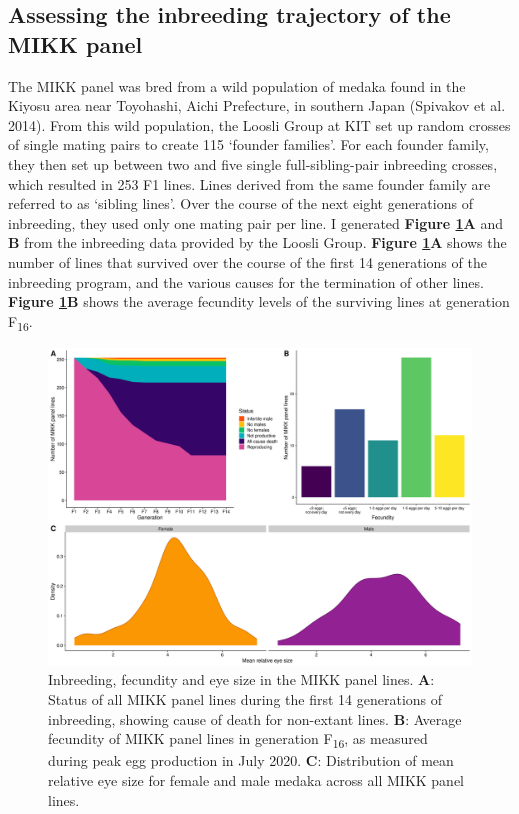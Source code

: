 \documentclass[
]{book}
\begin{document}
\hypertarget{inbreeding-sec}{%
\subsection{Assessing the inbreeding trajectory of the MIKK panel}\label{inbreeding-sec}}

The MIKK panel was bred from a wild population of medaka found in the Kiyosu area near Toyohashi, Aichi Prefecture, in southern Japan (Spivakov et al. 2014). From this wild population, the Loosli Group at KIT set up random crosses of single mating pairs to create 115 `founder families'. For each founder family, they then set up between two and five single full-sibling-pair inbreeding crosses, which resulted in 253 F1 lines. Lines derived from the same founder family are referred to as `sibling lines'. Over the course of the next eight generations of inbreeding, they used only one mating pair per line. I generated \textbf{Figure \ref{fig:InbreedingFigure}A} and \textbf{B} from the inbreeding data provided by the Loosli Group. \textbf{Figure \ref{fig:InbreedingFigure}A} shows the number of lines that survived over the course of the first 14 generations of the inbreeding program, and the various causes for the termination of other lines. \textbf{Figure \ref{fig:InbreedingFigure}B} shows the average fecundity levels of the surviving lines at generation F\textsubscript{16}.



\begin{figure}
\includegraphics[width=1\linewidth]{figs/mikk_genome/20211213_final_figure} \caption{Inbreeding, fecundity and eye size in the MIKK panel lines. \textbf{A}: Status of all MIKK panel lines during the first 14 generations of inbreeding, showing cause of death for non-extant lines. \textbf{B}: Average fecundity of MIKK panel lines in generation F\textsubscript{16}, as measured during peak egg production in July 2020. \textbf{C}: Distribution of mean relative eye size for female and male medaka across all MIKK panel lines.}\label{fig:InbreedingFigure}
\end{figure}
\end{document}
